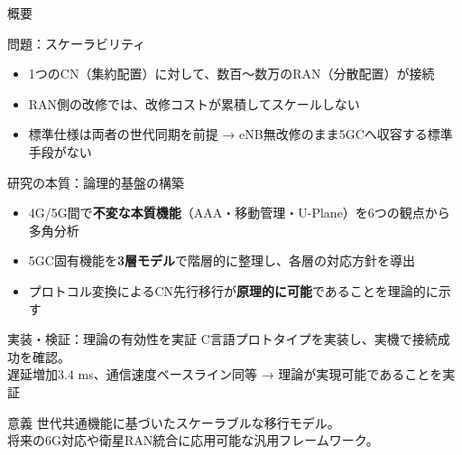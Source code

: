 \documentclass[dvipdfmx,11pt,aspectratio=169]{beamer}
\begin{document}
\begin{frame}{概要}
  \begin{block}{問題：スケーラビリティ}
    \begin{itemize}
      \item 1つのCN（集約配置）に対して、数百～数万のRAN（分散配置）が接続
      \item \alert{RAN側の改修では、改修コストが累積してスケールしない}
      \item 標準仕様は両者の世代同期を前提 → eNB無改修のまま5GCへ収容する標準手段がない
    \end{itemize}
  \end{block}

  \begin{block}{研究の本質：論理的基盤の構築}
    \begin{itemize}
      \item 4G/5G間で\textbf{不変な本質機能}（AAA・移動管理・U-Plane）を6つの観点から多角分析
      \item 5GC固有機能を\textbf{3層モデル}で階層的に整理し、各層の対応方針を導出
      \item プロトコル変換によるCN先行移行が\textbf{原理的に可能}であることを理論的に示す
    \end{itemize}
  \end{block}

  \begin{block}{実装・検証：理論の有効性を実証}
    C言語プロトタイプを実装し、実機で接続成功を確認。\\
    遅延増加3.4 ms、通信速度ベースライン同等 → 理論が実現可能であることを実証
  \end{block}

  \begin{block}{意義}
    世代共通機能に基づいたスケーラブルな移行モデル。\\
    将来の6G対応や衛星RAN統合に応用可能な汎用フレームワーク。
  \end{block}
\end{frame}

\end{document}
